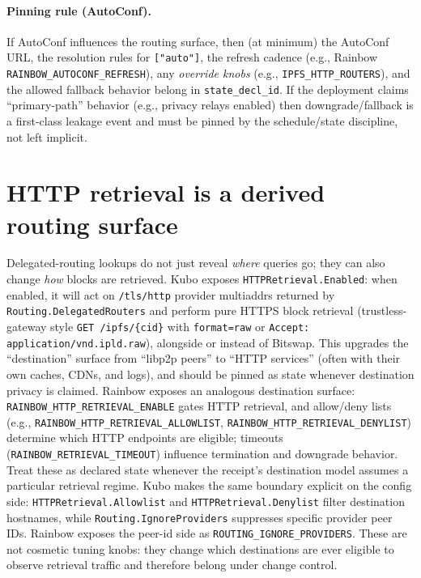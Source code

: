 \documentclass[11pt]{article}
\begin{document}
\paragraph{Pinning rule (AutoConf).}
If AutoConf influences the routing surface, then (at minimum) the AutoConf URL, the resolution rules for \texttt{["auto"]}, the refresh cadence (e.g., Rainbow \texttt{RAINBOW\_AUTOCONF\_\allowbreak REFRESH}), any \emph{override knobs} (e.g., \texttt{IPFS\_HTTP\_ROUTERS}), and the allowed fallback behavior belong in \texttt{state\_decl\_id}.
If the deployment claims ``primary-path'' behavior (e.g., privacy relays enabled) then downgrade/fallback is a first-class leakage event and must be pinned by the schedule/state discipline, not left implicit.\cite{series:operationalA,series:planstateequiv}

\section{HTTP retrieval is a derived routing surface}
Delegated-routing lookups do not just reveal \emph{where} queries go; they can also change \emph{how} blocks are retrieved.
Kubo exposes \texttt{HTTPRetrieval.Enabled}: when enabled, it will act on \texttt{/tls/http} provider multiaddrs returned by \texttt{Routing.DelegatedRouters} and perform pure HTTPS block retrieval (trustless-gateway style \verb|GET /ipfs/{cid}| with \texttt{format=raw} or \texttt{Accept: application/vnd.ipld.raw}), alongside or instead of Bitswap.\cite{kuboConfigHTTPRetrieval,trustlessGatewaySpec}
This upgrades the ``destination'' surface from ``libp2p peers'' to ``HTTP services'' (often with their own caches, CDNs, and logs), and should be pinned as state whenever destination privacy is claimed.
Rainbow exposes an analogous destination surface: \texttt{RAINBOW\_HTTP\_RETRIEVAL\_ENABLE} gates HTTP retrieval, and allow/deny lists (e.g., \texttt{RAINBOW\_HTTP\_RETRIEVAL\_ALLOWLIST}, \texttt{RAINBOW\_HTTP\_RETRIEVAL\_DENYLIST}) determine which HTTP endpoints are eligible; timeouts (\texttt{RAINBOW\_RETRIEVAL\_TIMEOUT}) influence termination and downgrade behavior. Treat these as declared state whenever the receipt's destination model assumes a particular retrieval regime.\cite{rainbowEnvVars}
Kubo makes the same boundary explicit on the config side: \texttt{HTTPRetrieval.Allowlist} and \texttt{HTTPRetrieval.Denylist} filter destination hostnames, while \texttt{Routing.IgnoreProviders} suppresses specific provider peer IDs. Rainbow exposes the peer-id side as \texttt{ROUTING\_IGNORE\_PROVIDERS}. These are not cosmetic tuning knobs: they change which destinations are ever eligible to observe retrieval traffic and therefore belong under change control.\cite{kuboConfigHTTPRetrieval,kuboConfigPathRouting,rainbowEnvVars}
\end{document}
